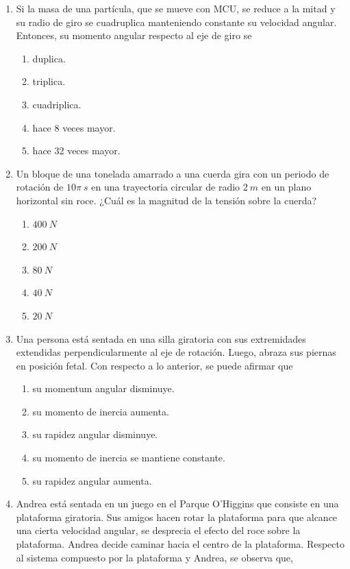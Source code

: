 \documentclass[letterpaper]{article}
\begin{document}
\begin{enumerate}
\item Si la masa de una partícula, que se mueve con MCU, se reduce a la mitad y su radio de giro se cuadruplica manteniendo constante su velocidad angular. Entonces, su momento angular respecto al eje de giro se

\begin{enumerate}[label=\Alph*)]
\item duplica.
\item triplica.
\item cuadriplica.
\item hace 8 veces mayor.
\item hace 32 veces mayor.
\end{enumerate}

\item Un bloque de una tonelada amarrado a una cuerda gira con un periodo de rotación de $10\pi\ \si{s}$ en una trayectoria circular de radio $2\ \si{m}$ en un plano horizontal sin roce. ¿Cuál es la magnitud de la tensión sobre la cuerda?

\begin{enumerate}[label=\Alph*)]
\item $400\ \si{N}$
\item $200\ \si{N}$
\item $80\ \si{N}$
\item $40\ \si{N}$
\item $20\ \si{N}$
\end{enumerate}

\item Una persona está sentada en una silla giratoria con sus extremidades extendidas perpendicularmente al eje de rotación. Luego, abraza sus piernas en posición fetal. Con respecto a lo anterior, se puede afirmar que

\begin{enumerate}[label=\Alph*)]
\item su momentum angular disminuye.
\item su momento de inercia aumenta.
\item su rapidez angular disminuye.
\item su momento de inercia se mantiene constante.
\item su rapidez angular aumenta.
\end{enumerate}

\item Andrea está sentada en un juego en el Parque O'Higgins que consiste en una plataforma giratoria. Sus amigos hacen rotar la plataforma para que alcance una cierta velocidad angular, se desprecia el efecto del roce sobre la plataforma. Andrea decide caminar hacia el centro de la plataforma. Respecto al sistema compuesto por la plataforma y Andrea, se observa que,


\end{enumerate}
\end{document}
